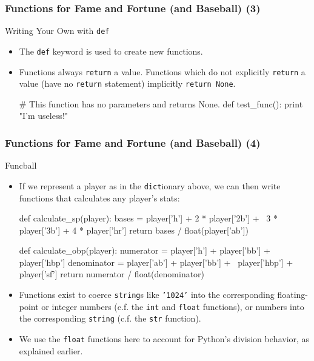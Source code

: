\documentclass[10pt]{beamer}
\begin{document}
\begin{frame}[fragile]
  \frametitle{Functions for Fame and Fortune (and Baseball) (3)}
  \begin{block}{Writing Your Own with \texttt{def}}
    \begin{itemize}
      \item The \texttt{def} keyword is used to create new functions.
      \item Functions always \texttt{return} a value. 
        Functions which do not explicitly \texttt{return} a value (have no \texttt{return} statement) implicitly \texttt{return None}.
        \begin{pythoncode}
  # This function has no parameters and returns None.
  def test_func():
    print "I'm useless!"
        \end{pythoncode}
    \end{itemize}
  \end{block}
\end{frame}

\begin{frame}[fragile]
  \frametitle{Functions for Fame and Fortune (and Baseball) (4)}
  \begin{block}{Funcball}
    \begin{itemize}
      \item If we represent a player as in the \texttt{dict}ionary above, we can then write functions that calculates any player's stats:
        \footnotesize
        \begin{pythoncode}
  def calculate_sp(player):
    bases = player['h'] + 2 * player['2b'] + \
      3 * player['3b'] + 4 * player['hr']
    return bases / float(player['ab'])

  def calculate_obp(player):
    numerator = player['h'] + player['bb'] + player['hbp']
    denominator = player['ab'] + player['bb'] + \
      player['hbp'] + player['sf']
    return numerator / float(denominator)
        \end{pythoncode}
        \normalsize
      \item Functions exist to coerce \texttt{string}s like \texttt{'1024'} into the corresponding floating-point or integer numbers (c.f. the \texttt{int} and \texttt{float} functions), or numbers into the corresponding \texttt{string} (c.f. the \texttt{str} function).
      \item We use the \texttt{float} functions here to account for Python's division behavior, as explained earlier.
    \end{itemize}
  \end{block}
\end{frame}
\end{document}
